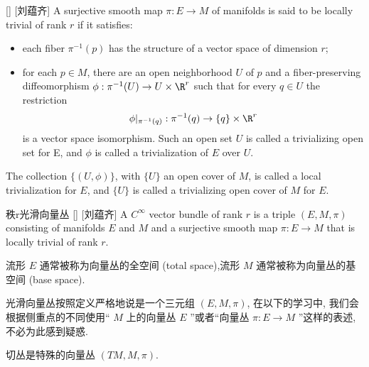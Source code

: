 \documentclass[UTF8]{ctexart}
\begin{document}
        \begin{dfn}
            []
            {}
            []
            [刘蕴齐]
            A surjective smooth map  \(\pi: E \to M\)  of manifolds is said to be locally trivial of rank  \(r\)  if
            it satisfies:
            \begin{itemize}
                \item each fiber  \(\pi^{-1}(p)\)  has the structure of a vector space of dimension  \(r\);
                \item  for each  \(p \in M\), there are an open neighborhood  \(U\)  of  \(p\)  and a fiber-preserving diffeomorphism  \(\phi: \pi^{-1}(U) \to U \times \R^r\)  such that for every  \(q \in U\)  the restriction
                \[
                    \phi | _{\pi^{-1}(q)}: \pi^{-1}(q) \to \{q\} \times \R^r
                \]
                is a vector space isomorphism. Such an open set  \(U\)  is called a trivializing open set for E, and  \(\phi\)  is called a trivialization of  \(E\)  over  \(U\).
            \end{itemize}
            The collection  \(\{(U,\phi)\}\), with  \(\{U\}\)  an open cover of  \(M\), is called a local trivialization for  \(E\), and  \(\{U\}\)  is called a trivializing open cover of  \(M\)  for  \(E\).
        \end{dfn}
        
        \begin{dfn}
            []
            {秩r光滑向量丛}
            []
            [刘蕴齐]
            A  \(C^{\infty}\)  vector bundle of rank  \(r\)  is a triple  \((E,M,\pi)\)  consisting of manifolds  \(E\)  and  \(M\)  and a surjective smooth map 
             \(\pi: E \to M\)  that is locally trivial of rank  \(r\). 
            
            流形 \(E\) 通常被称为向量丛的全空间 (total space),流形 \(M\) 通常被称为向量丛的基空间 (base space). 
        \end{dfn}

        \begin{rmk}
            []
            光滑向量丛按照定义严格地说是一个三元组 \((E,M,\pi)\), 在以下的学习中, 我们会根据侧重点的不同使用“ \(M\) 上的向量丛 \(E\) ”或者“向量丛 \(\pi: E \to M\) ”这样的表述, 不必为此感到疑惑. 
        \end{rmk}

        \begin{rmk}
            []
            切丛是特殊的向量丛 \((TM, M, \pi)\). 
        \end{rmk}
\end{document}

